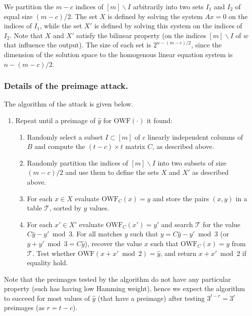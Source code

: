 \documentclass[orivec,envcountsect]{llncs}
\newcommand{\OWF}{\text{OWF}}
\begin{document}
We partition the $m - c$ indices of $[m] \backslash I$ arbitrarily into two sets $I_1$ and $I_2$ of equal size $(m -c)/2$. The set $X$ is defined by solving the system $Ax = 0$ on the indices of $I_1$, while the set $X'$ is defined by solving this system on the indices of $I_2$. Note that $X$ and $X'$ satisfy the bilinear property (on the indices $[m] \backslash I$ of $w$ that influence the output). The size of each set is $2^{n - (m -c)/2}$, since the dimension of the solution space to the homogenous linear equation system is $n - (m -c)/2$.

\subsubsection{Details of the preimage attack.}
The algorithm of the attack is given below.
\begin{enumerate}
\item Repeat until a preimage of $\hat{y}$ for $\OWF(\cdot)$ it found:
    \begin{enumerate}
    \item Randomly select a subset $I \subset [m]$ of $c$ linearly independent columns of $B$ and compute the $(t-c) \times t$ matrix $C$, as described above.
    \item Randomly partition the indices of $[m] \backslash I$ into two subsets of size $(m -c)/2$ and use them to define the sets $X$ and $X'$ as described above.
  \item For each $x \in X$ evaluate $\OWF_C(x) = y$ and store the pairs $(x,y)$ in a table $\mathcal{T}$, sorted by $y$ values.
  \item For each $x' \in X'$ evaluate $\OWF_C(x') = y'$ and search $\mathcal{T}$ for the value $C \hat{y} - y' \bmod 3$. For all matches $y$ such that $y = C \hat{y} - y' \bmod 3$ (or $y + y' \bmod 3 = C\hat{y}$), recover the value $x$ such that $\OWF_C(x) = y$ from $\mathcal{T}$. Test whether $\OWF(x + x' \bmod 2) = \hat{y}$, and return $x + x' \bmod 2$ if equality hold.
    \end{enumerate}
\end{enumerate}
Note that the preimages tested by the algorithm do not have any particular property (such has having low Hamming weight), hence we expect the algorithm to succeed for most values of $\hat{y}$ (that have a preimage) after testing $3^{t - r} = 3^c$ preimages (as $r = t-c$).
\end{document}
